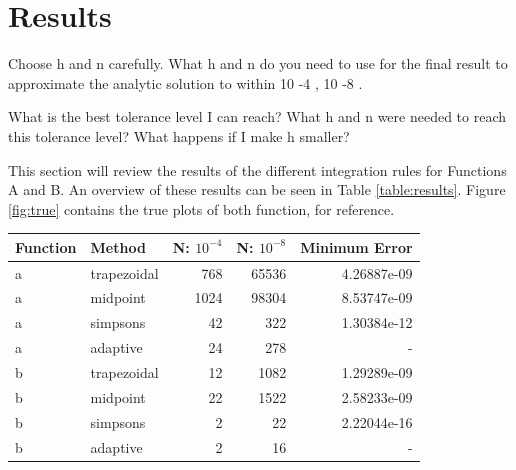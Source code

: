 \documentclass[a4paper]{article}
\begin{document}
\newpage
\section{Results}
\label{sec:results}

Choose h and n carefully. What h and n do you need to use for the final result to approximate the analytic solution to within 10 -4 , 10 -8 .


What is the best tolerance level I can reach? What h and n were needed to reach this tolerance level? What happens if I make h smaller?

This section will review the results of the different integration rules for Functions A and B. An overview of these results can be seen in Table \ref{table:results}. Figure \ref{fig:true} contains the true plots of both function, for reference.


\bgroup
\def\arraystretch{1.5}
\begin{center}
	\centering
	\begin{tabular}{l|l|r|r|r}
	\textbf{Function} & \textbf{Method} & \textbf{N: $10^{-4}$} & \textbf{N: $10^{-8}$} &\textbf{Minimum Error} \\
	\hline  
	a & trapezoidal & 768  & 65536 & 4.26887e-09 \\
    a & midpoint    & 1024 & 98304 & 8.53747e-09 \\
    a & simpsons    & 42   & 322   & 1.30384e-12 \\
    a & adaptive    & 24   & 278   & -           \\
    b & trapezoidal & 12   & 1082  & 1.29289e-09 \\
    b & midpoint    & 22   & 1522  & 2.58233e-09 \\
    b & simpsons    & 2    & 22    & 2.22044e-16 \\
    b & adaptive    & 2    & 16    & -  
	\end{tabular}
	\label{table:results}
\end{center}
\egroup
\end{document}
